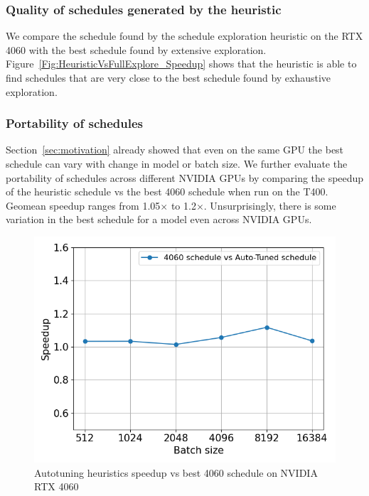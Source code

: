 \subsubsection*{Quality of schedules generated by the heuristic}
We compare the schedule found by the schedule exploration heuristic on the RTX 4060 with the best schedule found by extensive exploration. Figure~\ref{Fig:HeuristicVsFullExplore_Speedup} shows that the heuristic is able to find schedules that are very close to the best schedule found by exhaustive exploration.
\subsubsection*{Portability of schedules}
Section~\ref{sec:motivation} already showed that even on the same GPU the best schedule can vary with change in model or batch size.
We further evaluate the portability of schedules across different NVIDIA GPUs by comparing the speedup of the heuristic schedule vs the best 4060 schedule when run on the T400. Geomean speedup ranges from 1.05$\times$ to 1.2$\times$. Unsurprisingly, there is some variation in the best schedule for a model even across NVIDIA GPUs.
\begin{figure}[htb]
  \centering
  \includegraphics[width=0.75\linewidth]{figures/geomean_speedup_T400_4060_vs_T400.png}
  \caption{Autotuning heuristics speedup vs best 4060 schedule on NVIDIA RTX 4060}
  \label{Fig:AutotuningSpeedupvs4060Sched}
\end{figure}


